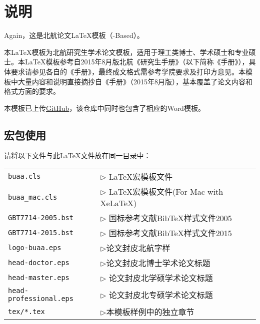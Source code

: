 \chapter{说明}

Again，这是北航论文\LaTeX{}模板（\CTeX{}-Based）\BUAAThesis{}。

本\LaTeX{}模板为北航研究生学术论文模板，适用于理工类博士、学术硕士和专业硕士。本\LaTeX{}模板参考自2015年8月版北航《研究生手册》（以下简称《手册》），具体要求请参见各自的《手册》，最终成文格式需参考学院要求及打印方意见。本模板中大量内容和说明直接摘抄自《手册》（2015年8月版），基本覆盖了论文内容和格式方面的要求。

本模板已上传\href{https://github.com/CheckBoxStudio/BUAAThesis}{GitHub}，该仓库中同时也包含了相应的Word模板。

\section{宏包使用}

请将以下文件与此LaTeX文件放在同一目录中：

\begin{tabular}{ll}
 \verb|buaa.cls |             & $\triangleright$ LaTeX宏模板文件 \\
 \verb|buaa_mac.cls |         & $\triangleright$ LaTeX宏模板文件(For Mac with XeLaTeX) \\
 \verb|GBT7714-2005.bst|      & $\triangleright$ 国标参考文献BibTeX样式文件2005 \\
 \verb|GBT7714-2015.bst|      & $\triangleright$ 国标参考文献BibTeX样式文件2015 \\
 \verb|logo-buaa.eps|         & $\triangleright$论文封皮北航字样 \\
 \verb|head-doctor.eps|       & $\triangleright$论文封皮北博士学术论文标题\\
 \verb|head-master.eps|       & $\triangleright$ 论文封皮北学硕学术论文标题 \\
 \verb|head-professional.eps| & $\triangleright$ 论文封皮北专硕学术论文标题\\
 \verb|tex/*.tex|             & $\triangleright$本模板样例中的独立章节\\
\end{tabular}\\

